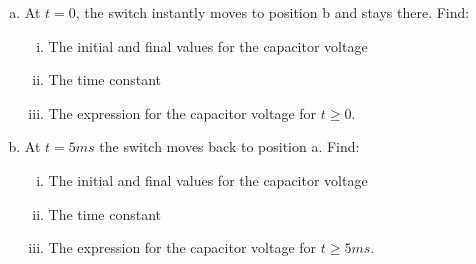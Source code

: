 \documentclass[12pt]{article}
\begin{document}
\begin{enumerate}[(a)]
\item At $t=0$, the switch instantly moves to position b and stays there. Find:
\begin{enumerate}[(i)]
\item The initial and final values for the capacitor voltage
\item The time constant
\item The expression for the capacitor voltage for $t \geq 0$.
\end{enumerate}
\item At $t = 5ms$ the switch moves back to position a. Find:
\begin{enumerate}[(i)]
\item The initial and final values for the capacitor voltage
\item The time constant
\item The expression for the capacitor voltage for $t \geq 5 ms$.
\end{enumerate}

\end{enumerate}
\end{document}
